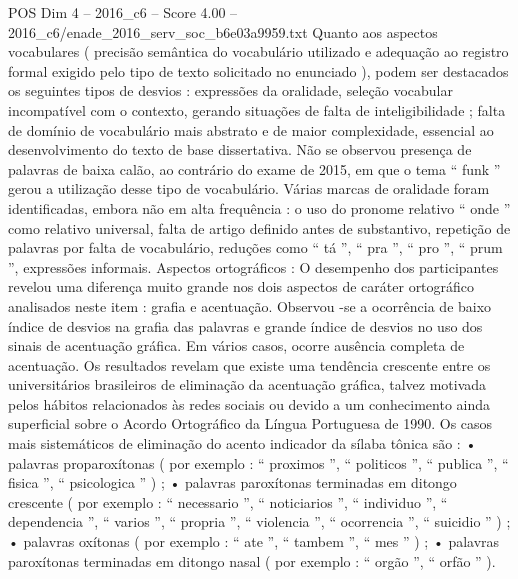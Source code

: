 \begin{textsample}{POS Dim 4 – 2016\_c6 – Score 4.00 – 2016\_c6/enade\_2016\_serv\_soc\_b6e03a9959.txt}
Quanto aos aspectos vocabulares ( precisão semântica do vocabulário utilizado e adequação ao registro formal exigido pelo tipo de texto solicitado no enunciado ), podem ser destacados os seguintes tipos de desvios : expressões da oralidade, seleção vocabular incompatível com o contexto, gerando situações de falta de inteligibilidade ; falta de domínio de vocabulário mais abstrato e de maior complexidade, essencial ao desenvolvimento do texto de base dissertativa.
Não se observou presença de palavras de baixa calão, ao contrário do exame de 2015, em que o tema “ funk ” gerou a utilização desse tipo de vocabulário.
Várias marcas de oralidade foram identificadas, embora não em alta frequência : o uso do pronome relativo “ onde ” como relativo universal, falta de artigo definido antes de substantivo, repetição de palavras por falta de vocabulário, reduções como “ tá ”, “ pra ”, “ pro ”, “ prum ”, expressões informais.
Aspectos ortográficos : O desempenho dos participantes revelou uma diferença muito grande nos dois aspectos de caráter ortográfico analisados neste item : grafia e acentuação.
Observou -se a ocorrência de baixo índice de desvios na grafia das palavras e grande índice de desvios no uso dos sinais de acentuação gráfica.
Em vários casos, ocorre ausência completa de acentuação.
Os resultados revelam que existe uma tendência crescente entre os universitários brasileiros de eliminação da acentuação gráfica, talvez motivada pelos hábitos relacionados às redes sociais ou devido a um conhecimento ainda superficial sobre o Acordo Ortográfico da Língua Portuguesa de 1990.
Os casos mais sistemáticos de eliminação do acento indicador da sílaba tônica são : • palavras proparoxítonas ( por exemplo : “ proximos ”, “ politicos ”, “ publica ”, “ fisica ”, “ psicologica ” ) ; • palavras paroxítonas terminadas em ditongo crescente ( por exemplo : “ necessario ”, “ noticiarios ”, “ individuo ”, “ dependencia ”, “ varios ”, “ propria ”, “ violencia ”, “ ocorrencia ”, “ suicidio ” ) ; • palavras oxítonas ( por exemplo : “ ate ”, “ tambem ”, “ mes ” ) ; • palavras paroxítonas terminadas em ditongo nasal ( por exemplo : “ orgão ”, “ orfão ” ).

\end{textsample}
